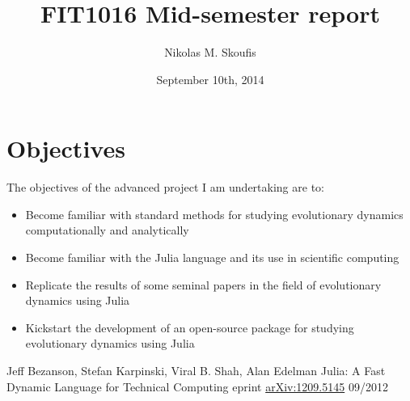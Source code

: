 \documentclass[a4paper,12pt]{article}
\begin{document}
\title{FIT1016 Mid-semester report}
\author{Nikolas M. Skoufis}
\date{September 10th, 2014}

\maketitle

\section*{Objectives}

The objectives of the advanced project I am undertaking are to:

\begin{itemize}
        
    \item Become familiar with standard methods for studying evolutionary dynamics computationally and analytically
    \item Become familiar with the Julia \cite{julia} language and its use in scientific computing
    \item Replicate the results of some seminal papers in the field of evolutionary dynamics using Julia
    \item Kickstart the development of an open-source package for studying evolutionary dynamics using Julia

\end{itemize}

\begin{thebibliography}{9}

        Jeff Bezanson, Stefan Karpinski, Viral B. Shah, Alan Edelman
        Julia: A Fast Dynamic Language for Technical Computing
        eprint \href{http://arxiv.org/pdf/1209.5145v1.pdf}{arXiv:1209.5145}
        09/2012

\end{thebibliography}
\end{document}
